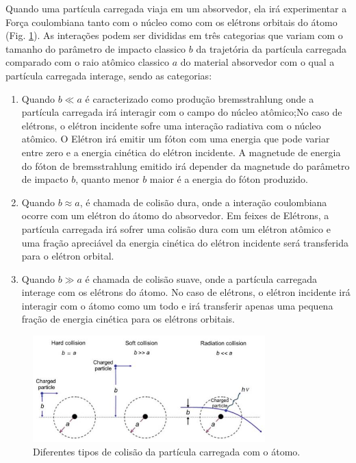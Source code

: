 \documentclass[11pt,a4paper]{article}
\begin{document}
    Quando uma partícula carregada viaja em um absorvedor, ela irá experimentar a Força coulombiana tanto com o núcleo como com os elétrons orbitais do átomo (Fig. \ref{fig:colisoesComOAtomo}). As interações podem ser divididas em três categorias que variam com o tamanho do parâmetro de impacto classico $b$ da trajetória da partícula carregada comparado com o raio atômico classico $a$ do material absorvedor com o qual a partícula carregada interage, sendo as categorias:

    \begin{enumerate}
		\item Quando $b \ll a$ é caracterizado como produção bremsstrahlung onde a partícula carregada irá interagir com o campo do núcleo atômico;No caso de elétrons, o elétron incidente sofre uma interação radiativa com o núcleo atômico. O Elétron irá emitir um fóton com uma energia que pode variar entre zero e a energia cinética do elétron incidente. A magnetude de energia do fóton de bremsstrahlung emitido irá depender da magnetude do parâmetro de impacto $b$, quanto menor $b$ maior é a energia do fóton produzido. 
		\item Quando $b \approx a$, é chamada de colisão dura, onde a interação coulombiana ocorre com um elétron do átomo do absorvedor. Em feixes de Elétrons,  a partícula carregada irá sofrer uma colisão dura com um elétron atômico e uma fração apreciável da energia cinética do elétron incidente será transferida para o elétron orbital. 
		\item Quando $ b \gg a $ é chamada de colisão suave, onde a partícula carregada interage com os elétrons do átomo. No caso de elétrons, o elétron incidente irá interagir com o átomo como um todo e irá transferir apenas uma pequena fração de energia cinética para os elétrons orbitais. 
	\end{enumerate}


    \begin{figure}[h]
		\centering
		\includegraphics[width=0.8\textwidth]{Imagens/tiposDeColisoes.JPG}
		\caption{Diferentes tipos de colisão da partícula carregada com o átomo.}
		\label{fig:colisoesComOAtomo}                
	\end{figure}            
\end{document}
